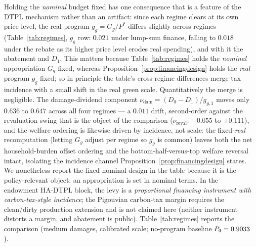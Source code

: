 \documentclass[12pt]{article}
\begin{document}
Holding the \emph{nominal} budget fixed has one consequence that is a
feature of the DTPL mechanism rather than an artifact: since
each regime clears at its own price level, the real program $g_g=G_g/P^{*}$
differs slightly across regimes (Table~\ref{tab:regimes}, $g_g$ row: $0.021$
under lump-sum finance, falling to $0.018$ under the rebate as its higher
price level erodes real spending), and with it the abatement and $D_1$. This
matters because Table~\ref{tab:regimes} holds the \emph{nominal} appropriation
$G_g$ fixed, whereas Proposition~\ref{prop:financingdesign} holds the
\emph{real} program $g_g$ fixed; so in principle the table's cross-regime
differences merge tax incidence with a small shift in the real green scale.
Quantitatively the merge is negligible. The damage-dividend component
$\nu_{\mathrm{dam}} = (D_0-D_1)/g_{g,1}$ moves only $0.636$ to $0.647$ across
all four regimes --- a $0.011$ drift, second-order against the
revaluation swing that is the object of the comparison ($\nu_{\mathrm{reval}}$:
$-0.055$ to $+0.111$), and the welfare ordering is likewise driven by
incidence, not scale: the fixed-\emph{real} recomputation (letting $G_g$ adjust
per regime so $g_g$ is common) leaves both the net household-burden offset ordering and the
bottom-half-versus-top welfare reversal intact, isolating the incidence channel
Proposition~\ref{prop:financingdesign} states. We nonetheless report the
fixed-nominal design in the table because it is the policy-relevant object:
an appropriation is set in nominal terms. In the
endowment HA-DTPL block, the levy is a \emph{proportional
financing instrument with carbon-tax-style incidence}; the Pigouvian
carbon-tax margin requires the clean/dirty production extension and is not
claimed here (neither instrument distorts a margin, and abatement is public).
Table~\ref{tab:regimes} reports the comparison (medium damages, calibrated scale;
no-program baseline $P_0 = 0.9033$).
\end{document}
